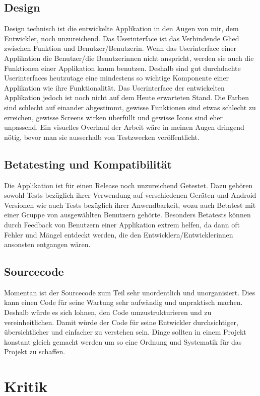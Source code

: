 \documentclass[a4paper,11pt]{report}
\begin{document}
		\subsection*{Design}
		Design technisch ist die entwickelte Applikation in den Augen von mir, dem Entwickler, noch unzureichend. Das Userinterface ist das Verbindende Glied zwischen Funktion und Benutzer/Benutzerin. Wenn das Userinterface einer Applikation die Benutzer/die Benutzerinnen nicht anspricht, werden sie auch die Funktionen einer Applikation kaum benutzen. Deshalb sind gut durchdachte Userinterfaces heutzutage eine mindestens so wichtige Komponente einer Applikation wie ihre Funktionalität. Das Userinterface der entwickelten Applikation jedoch ist noch nicht auf dem Heute erwarteten Stand. Die Farben sind schlecht auf einander abgestimmt, gewisse Funktionen sind etwas schlecht zu erreichen, gewisse Screens wirken überfüllt und gewisse Icons sind eher unpassend. Ein visuelles Overhaul der Arbeit wäre in meinen Augen dringend nötig, bevor man sie ausserhalb von Testzwecken veröffentlicht.
		
		\subsection*{Betatesting und Kompatibilität}
		Die Applikation ist für einen Release noch unzureichend Getestet. Dazu gehören sowohl Tests bezüglich ihrer Verwendung auf verschiedenen Geräten und Android Versionen wie auch Tests bezüglich ihrer Anwendbarkeit, wozu auch Betatest mit einer Gruppe von ausgewählten Benutzern gehörte. Besonders Betatests können durch Feedback von Benutzern einer Applikation extrem helfen, da dann oft Fehler und Mängel entdeckt werden, die den Entwicklern/Entwicklerinnen ansonsten entgangen wären.
		
		\subsection*{Sourcecode}
		Momentan ist der Sourcecode zum Teil sehr unordentlich und unorganisiert. Dies kann einen Code für seine Wartung sehr aufwändig und unpraktisch machen. Deshalb würde es sich lohnen, den Code umzustrukturieren und zu vereinheitlichen. Damit würde der Code für seine Entwickler durchsichtiger, übersichtlicher und einfacher zu verstehen sein. Dinge sollten in einem Projekt konstant gleich gemacht werden um so eine Ordnung und Systematik für das Projekt zu schaffen.
		
		
		\section{Kritik}
\end{document}
